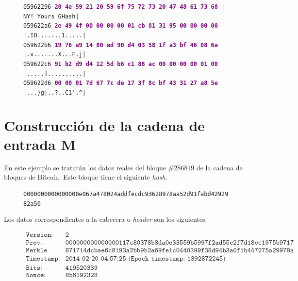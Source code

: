 \documentclass{article}
\begin{document}
\begin{figure}[H]
{    \texttt{05962296  \textbf{\textcolor{purple}{20 4e 59 21 20 59 6f 75  72 73 20 47 48 61 73 68}}  | NY! Yours GHash|} \\
    \texttt{059622a6  \textbf{\textcolor{purple}{2e 49 4f 00 00 00 00 01  cb 81 31 95 00 00 00 00}}  |.IO.......1.....|} \\
    \texttt{059622b6  \textbf{\textcolor{purple}{19 76 a9 14 80 ad 90 d4  03 58 1f a3 bf 46 08 6a}}  |.v.......X...F.j|} \\
    \texttt{059622c6  \textbf{\textcolor{purple}{91 b2 d9 d4 12 5d b6 c1  88 ac 00 00 00 00 01 00}}  |.....]..........|} \\
    \texttt{059622d6  \textbf{\textcolor{purple}{00 00 01 7d 67 7c de 17  3f 8c bf 43 31 27 a8 5e}}  |...\}g|..?..C1'.\textasciicircum|}
    }
    \end{figure}
    
\section{Construcción de la cadena de entrada M}
    En este ejemplo se tratarán los datos reales del bloque $\#286819$ de la cadena de bloques de Bitcoin. Este bloque tiene el siguiente \textit{hash}.
    
    \begin{figure}[H]
        \centering
        \scriptsize{
        \texttt{0000000000000000e067a478024addfecdc93628978aa52d91fabd4292982a50}
        }
    \end{figure}
    
    Los datos correspondientes a la cabecera o \textit{header} son los siguientes:
    \begin{figure}[H]
        \centering
        \scriptsize{
            $\begin{array}{ll}
                \texttt{Version:} & \texttt{2} \\
                \texttt{Prev. Block:} & \texttt{000000000000000117c80378b8da0e33559b5997f2ad55e2f7d18ec1975b9717} \\
                \texttt{Merkle root:} & \texttt{871714dcbae6c8193a2bb9b2a69fe1c0440399f38d94b3a0f1b447275a29978a} \\
                \texttt{Timestamp:} & \texttt{2014-02-20 04:57:25 (Epoch timestamp: 1392872245)} \\
                \texttt{Bits:} & \texttt{419520339} \\
                \texttt{Nonce:} & \texttt{856192328} \\
            \end{array}$
        }
        \end{figure}
    
\end{document}
